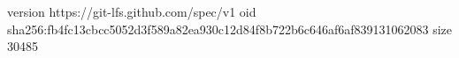 version https://git-lfs.github.com/spec/v1
oid sha256:fb4fc13cbcc5052d3f589a82ea930c12d84f8b722b6c646af6af839131062083
size 30485
